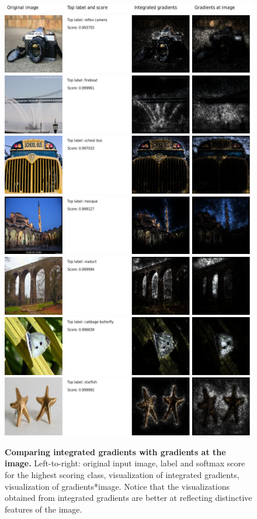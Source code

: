 \begin{figure}[!htb]
  \centering
  \includegraphics[width=0.7\columnwidth]{./Figures/IntegratedGrads/img0.jpg}
  \includegraphics[width=0.7\columnwidth]{./Figures/IntegratedGrads/img1.jpg}
  \includegraphics[width=0.7\columnwidth]{./Figures/IntegratedGrads/img2.jpg}
  \includegraphics[width=0.7\columnwidth]{./Figures/IntegratedGrads/img3.jpg}
  \includegraphics[width=0.7\columnwidth]{./Figures/IntegratedGrads/img4.jpg}
  \includegraphics[width=0.7\columnwidth]{./Figures/IntegratedGrads/img5.jpg}
  \includegraphics[width=0.7\columnwidth]{./Figures/IntegratedGrads/img6.jpg}
  \includegraphics[width=0.7\columnwidth]{./Figures/IntegratedGrads/img7.jpg}
  \caption{\textbf{Comparing integrated gradients with gradients at the image.}
    Left-to-right: original input image, label and softmax score for
    the highest scoring class, visualization of integrated gradients,
    visualization of gradients*image.
    Notice that the visualizations
    obtained from integrated gradients are better at reflecting distinctive
    features of the image.
  }\label{fig:intgrad-finalgrad}
\end{figure}


